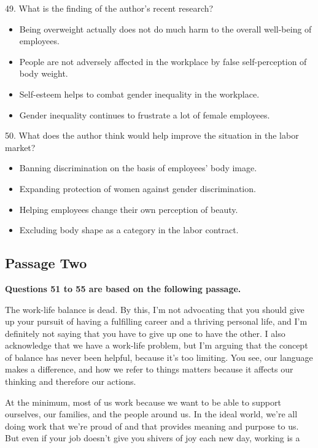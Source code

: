\documentclass[UTF8,11pt]{ctexart}
\begin{document}
49. What is the finding of the author's recent research?


\begin{itemize}[leftmargin=2em,itemsep=.2em,topsep=.4em]\item[A.] Being overweight actually does not do much harm to the overall well-being of employees.
\item[B.] People are not adversely affected in the workplace by false self-perception of body weight.
\item[C.] Self-esteem helps to combat gender inequality in the workplace.
\item[D.] Gender inequality continues to frustrate a lot of female employees.
\end{itemize}

50. What does the author think would help improve the situation in the labor market?


\begin{itemize}[leftmargin=2em,itemsep=.2em,topsep=.4em]\item[A.] Banning discrimination on the basis of employees' body image.
\item[B.] Expanding protection of women against gender discrimination.
\item[C.] Helping employees change their own perception of beauty.
\item[D.] Excluding body shape as a category in the labor contract.
\end{itemize}

\subsection*{\textbf{Passage Two}}


\textbf{Questions 51 to 55 are based on the following passage.}


The work-life balance is dead. By this, I'm not advocating that you should give up your pursuit of having a fulfilling career and a thriving personal life, and I'm definitely not saying that you have to give up one to have the other. I also acknowledge that we have a work-life problem, but I'm arguing that the concept of balance has never been helpful, because it's too limiting. You see, our language makes a difference, and how we refer to things matters because it affects our thinking and therefore our actions.


At the minimum, most of us work because we want to be able to support ourselves, our families, and the people around us. In the ideal world, we're all doing work that we're proud of and that provides meaning and purpose to us. But even if your job doesn't give you shivers of joy each new day, working is a
\end{document}
